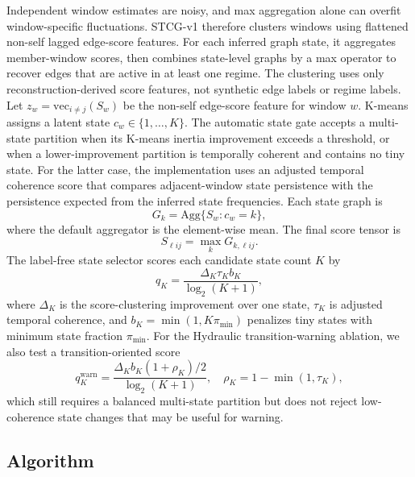 \documentclass[sigconf,review,anonymous]{acmart}
\begin{document}
Independent window estimates are noisy, and max aggregation alone can overfit window-specific fluctuations.
STCG-v1 therefore clusters windows using flattened non-self lagged edge-score features.
For each inferred graph state, it aggregates member-window scores, then combines state-level graphs by a max operator to recover edges that are active in at least one regime.
The clustering uses only reconstruction-derived score features, not synthetic edge labels or regime labels.
Let $z_w=\mathrm{vec}_{i\neq j}(S_w)$ be the non-self edge-score feature for window $w$.
K-means assigns a latent state $c_w \in \{1,\ldots,K\}$.
The automatic state gate accepts a multi-state partition when its K-means inertia improvement exceeds a threshold, or when a lower-improvement partition is temporally coherent and contains no tiny state.
For the latter case, the implementation uses an adjusted temporal coherence score that compares adjacent-window state persistence with the persistence expected from the inferred state frequencies.
Each state graph is
\[
G_k = \mathrm{Agg}\{S_w: c_w=k\},
\]
where the default aggregator is the element-wise mean.
The final score tensor is
\[
S_{\ell i j} = \max_k G_{k,\ell i j}.
\]
The label-free state selector scores each candidate state count $K$ by
\[
q_K = \frac{\Delta_K \tau_K b_K}{\log_2(K+1)},
\]
where $\Delta_K$ is the score-clustering improvement over one state, $\tau_K$ is adjusted temporal coherence, and $b_K=\min(1,K\pi_{\min})$ penalizes tiny states with minimum state fraction $\pi_{\min}$.
For the Hydraulic transition-warning ablation, we also test a transition-oriented score
\[
q^{\mathrm{warn}}_K =
\frac{\Delta_K b_K(1+\rho_K)/2}{\log_2(K+1)}, \quad
\rho_K = 1-\min(1,\tau_K),
\]
which still requires a balanced multi-state partition but does not reject low-coherence state changes that may be useful for warning.

\subsection{Algorithm}
\end{document}
